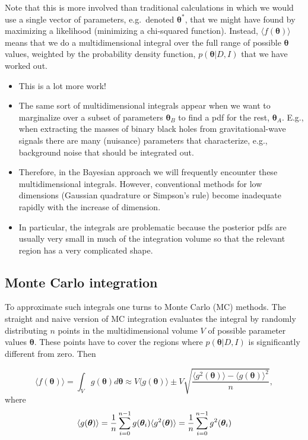 \documentclass[%
oneside,                 %
final,                   %
10pt]{article}
\begin{document}
Note that this is more involved than traditional calculations in which we would use a single vector of parameters, e.g.~denoted $\boldsymbol{\theta}^*$, that we might have found by maximizing a likelihood (minimizing a chi-squared function). Instead, $\langle f( \boldsymbol{\theta} ) \rangle$ means that we do a multidimensional integral over the full range of possible $\boldsymbol{\theta}$ values, weighted by the probability density function, $p(\boldsymbol{\theta} |D,I)$ that we have worked out.

\begin{itemize}
\item This is a lot more work!

\item The same sort of multidimensional integrals appear when we want to marginalize over a subset of parameters $\boldsymbol{\theta}_B$ to find a pdf for the rest, $\boldsymbol{\theta}_A$. E.g., when extracting the masses of binary black holes from gravitational-wave signals there are many (nuisance) parameters that characterize, e.g.,   background noise that should be integrated out.

\item Therefore, in the Bayesian approach we will frequently encounter these multidimensional integrals. However, conventional methods for low dimensions (Gaussian quadrature or Simpson's rule) become inadequate rapidly with the increase of dimension.

\item In particular, the integrals are problematic because the posterior pdfs are usually very small in much of the integration volume so that the relevant region has a very complicated shape.
\end{itemize}

\noindent
\subsection{Monte Carlo integration}
To approximate such integrals one turns to Monte Carlo (MC) methods. The straight and naive version of MC integration evaluates the integral by randomly distributing $n$ points in the multidimensional volume $V$ of possible parameter values $\boldsymbol{\theta}$. These points have to cover the regions where $p( \boldsymbol{\theta} |D,I)$ is significantly different from zero. Then

\[
\langle f( \boldsymbol{\theta} ) \rangle = \int_V g( \boldsymbol{\theta} ) d\boldsymbol{\theta} \approx V \langle g( \boldsymbol{\theta} ) \rangle 
\pm V \sqrt{ \frac{\langle g^2( \boldsymbol{\theta} ) \rangle - \langle g( \boldsymbol{\theta} ) \rangle^2 }{n} },
\]
where
\[
\langle g( \boldsymbol{\theta} ) \rangle = \frac{1}{n} \sum_{i=0}^{n-1} g(\boldsymbol{\theta}_i ) \\
\langle g^2( \boldsymbol{\theta} ) \rangle = \frac{1}{n} \sum_{i=0}^{n-1} g^2(\boldsymbol{\theta}_i )
\]
\end{document}

